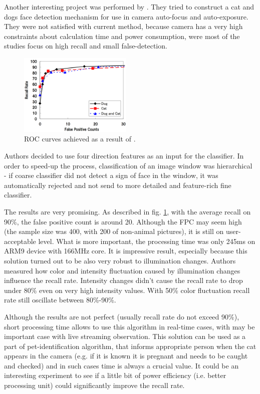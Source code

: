 \documentclass[hyperref]{acmtrans2e}
\begin{document}
Another interesting project was performed by \cite{edges:2011}. They tried to construct a cat and dogs face detection mechanism for use in camera auto-focus and auto-exposure. They were not satisfied with current method, because camera has a very high constraints about calculation time and power consumption, were most of the studies focus on high recall and small false-detection. 
\begin{figure}
\centering
    \includegraphics[width=0.48\textwidth]{roc_edges}
  \caption{ROC curves achieved as a result of \protect\cite{edges:2011}.}
  \label{fig:roc_edges}
\end{figure}
Authors decided to use four direction features as an input for the classifier. In order to speed-up the process, classification of an image window was hierarchical - if coarse classifier did not detect a sign of face in the window, it was automatically rejected and not send to more detailed and feature-rich fine classifier. 

The results are very promising. As described in fig. \ref{fig:roc_edges}, with the average recall on 90\%, the false positive count is around 20. Although the FPC may seem high (the sample size was 400, with 200 of non-animal pictures), it is still on user-acceptable level. What is more important, the processing time was only 245ms on ARM9 device with 166MHz core. It is impressive result, especially because this solution turned out to be also very robust to illumination changes. Authors measured how color and intensity fluctuation caused by illumination changes influence the recall rate. Intensity changes didn't cause the recall rate to drop under 80\% even on very high intensity values. With 50\% color fluctuation recall rate still oscillate between 80\%-90\%. 

Although the results are not perfect (usually recall rate do not exceed 90\%), short processing time allows to use this algorithm in real-time cases, with may be important case with live streaming observation. This solution can be used as a part of pet-identification algorithm, that informs appropriate person when the cat appears in the camera (e.g. if it is known it is pregnant and needs to be caught and checked) and in such cases time is always a crucial value. It could be an interesting experiment to see if a little bit of power efficiency (i.e. better processing unit) could significantly improve the recall rate.
\end{document}
